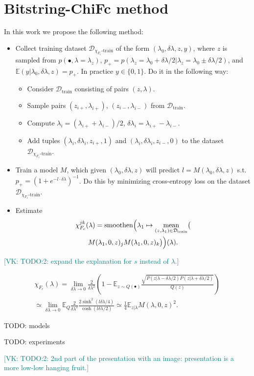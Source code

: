 \documentclass[
  american,aps,pra,reprint,floatfix,nofootinbib,superscriptaddress
]{revtex4-2}
\DeclareMathOperator{\smoothen}{smoothen}
\DeclareMathOperator{\mean}{mean}
\newcommand{\VK}[1]{\textcolor{teal}{[VK: #1]}}
\begin{document}
\section{Bitstring-ChiFc method}
In this work we propose the following method:
\begin{itemize}
  \item Collect training dataset $\mathcal{D}_{\chi_{F_c}\textrm{-train}}$ of
  the form $(\lambda_0, \delta \lambda, z, y)$, where $z$ is sampled from
  $p(\bullet, \lambda=\lambda_{z})$,
  $p_{+} = p(\lambda_{z} = \lambda_0 + \delta \lambda / 2| \lambda_{z} = \lambda_0 \pm \delta \lambda / 2)$, and
    $\mathbb{E}(y|\lambda_0, \delta \lambda, z) = p_{+}$.
    In practice $y \in \{0, 1\}$.
    Do it in the following way:
    \begin{itemize}
      \item Consider $\mathcal{D}_{\textrm{train}}$ consisting of pairs
      $(z, \lambda)$.
      \item Sample pairs $(z_{i{+}}, \lambda_{i{+}})$,
      $(z_{i{-}}, \lambda_{i{-}})$ from $\mathcal{D}_{\textrm{train}}$.
      \item Compute $\lambda_i = (\lambda_{i{+}} + \lambda_{i{-}})/2$,
      $\delta \lambda_i = \lambda_{i{+}} - \lambda_{i{-}}$.
      \item Add tuples $(\lambda_i, \delta \lambda_i, z_{i{+}}, 1)$ and $(\lambda_i, \delta \lambda_i, z_{i{-}}, 0)$ to the dataset $\mathcal{D}_{\chi_{F_c}\textrm{-train}}$.
    \end{itemize}
  \item Train a model $M$, which given $(\lambda_0, \delta \lambda, z)$
  will predict $l = M(\lambda_0, \delta \lambda, z)$
  s.t. $p_{+} = (1+e^{-l \cdot \delta \lambda})^{-1}$.
  Do this by minimizing cross-entropy loss on the dataset
  $\mathcal{D}_{\chi_{F_c}\textrm{-train}}$.
  \item Estimate
  \begin{multline}
  \chi_{F_c}^{jk}(\lambda) = \smoothen\Bigl(
  \lambda_1 \mapsto \mean_{(z, \lambda_1) \in \mathcal{D}_{\textrm{train}}}
  \bigl(\\
  M(\lambda_1, 0, z)_{j}M(\lambda_1, 0, z)_{k}\bigr)\Bigr)(\lambda).
  \end{multline}
\end{itemize}

\VK{TODO:2: expand the explanation for $s$ instead of $\lambda$.}

    \begin{multline*}
      \chi_{F_c}(\lambda) = \lim_{\delta \lambda\to 0} \frac2{\delta \lambda^2} \left(1 - \mathbb{E}_{z\sim Q(\bullet)} \frac{\sqrt{P(z|\lambda-\delta \lambda/2)P(z|\lambda+\delta \lambda/2)}}{Q(z)}\right)
      \\ \simeq \lim_{\delta \lambda\to 0} \mathbb{E}_{Q}\frac2{\delta \lambda^2}\frac{2\sinh^2(l\delta \lambda/4)}{\cosh(l\delta \lambda/2)} \simeq \frac14 \mathbb{E}_{z|\lambda} M(\lambda, 0, z)^2.
    \end{multline*}

TODO: models

TODO: experiments

\VK{TODO:2: 2nd part of the presentation with an image: presentation is a more low-low hanging fruit.}



\end{document}
